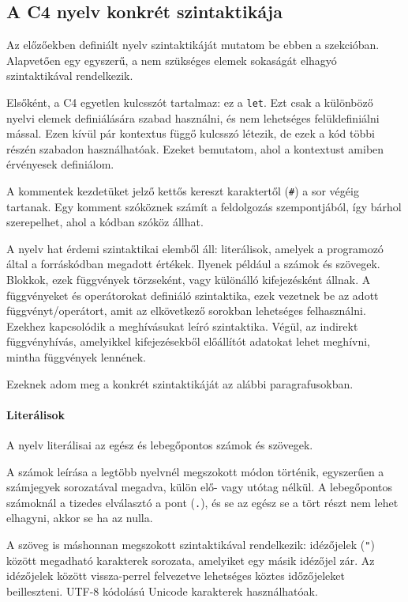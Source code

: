 \subsection{A C4 nyelv konkrét szintaktikája}

Az előzőekben definiált nyelv szintaktikáját mutatom be ebben a szekcióban.
Alapvetően egy egyszerű, a nem szükséges elemek sokaságát elhagyó szintaktikával rendelkezik.

Elsőként, a C4 egyetlen kulcsszót tartalmaz: ez a {\tt let}. 
Ezt csak a különböző nyelvi elemek definiálására szabad használni, és nem lehetséges felüldefiniálni mással.
Ezen kívül pár kontextus függő kulcsszó létezik, de ezek a kód többi részén szabadon használhatóak.
Ezeket bemutatom, ahol a kontextust amiben érvényesek definiálom.

A kommentek kezdetüket jelző kettős kereszt karaktertől ({\tt \#}) a sor végéig tartanak.
Egy komment szóköznek számít a feldolgozás szempontjából, így bárhol szerepelhet, ahol a kódban szóköz állhat.

A nyelv hat érdemi szintaktikai elemből áll: literálisok, amelyek a programozó által a forráskódban megadott értékek. 
Ilyenek például a számok és szövegek.
Blokkok, ezek függvények törzseként, vagy különálló kifejezésként állnak.
A függvényeket és operátorokat definiáló szintaktika, ezek vezetnek be az adott függvényt/operátort, amit az elkövetkező sorokban lehetséges felhasználni.
Ezekhez kapcsolódik a meghívásukat leíró szintaktika.
Végül, az indirekt függvényhívás, amelyikkel kifejezésekből előállítót adatokat lehet meghívni, mintha függvények lennének.

Ezeknek adom meg a konkrét szintaktikáját az alábbi paragrafusokban.

\paragraph{Literálisok} A nyelv literálisai az egész és lebegőpontos számok és szövegek.

A számok leírása a legtöbb nyelvnél megszokott módon történik, egyszerűen a számjegyek sorozatával megadva, külön elő- vagy utótag nélkül.
A lebegőpontos számoknál a tizedes elválasztó a pont ({\tt .}), és se az egész se a tört részt nem lehet elhagyni, akkor se ha az nulla.

A szöveg is máshonnan megszokott szintaktikával rendelkezik: idézőjelek ({\tt "}) között megadható karakterek sorozata, amelyiket egy másik idézőjel zár.
Az idézőjelek között vissza-perrel felvezetve lehetséges köztes időzőjeleket beilleszteni.
UTF-8 kódolású Unicode karakterek használhatóak.


